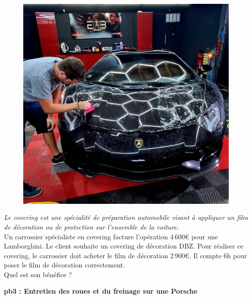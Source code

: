 \begin{multicols}{2} 
  \begin{figure}[H]
    \centering
    \includegraphics[width=0.6\linewidth]{5x2-inegalite-triangulaire/lambo.jpg}
  \end{figure} \columnbreak

  \textit{Le covering est une spécialité de préparation automobile visant à appliquer un film de décoration ou de protection sur l'ensemble de la voiture.} \\

  Un carrossier spécialiste en covering facture l'opération 4\,600€ pour une Lamborghini. Le client souhaite un covering de décoration DBZ.
  Pour réaliser ce covering, le carrossier doit acheter le film de décoration 2\,900€. Il compte 6h pour poser le film de décoration correctement. \\

  Quel est son bénéfice ? 
\end{multicols}

\newpage

\textbf{pb3 : Entretien des roues et du freinage sur une Porsche} \\

